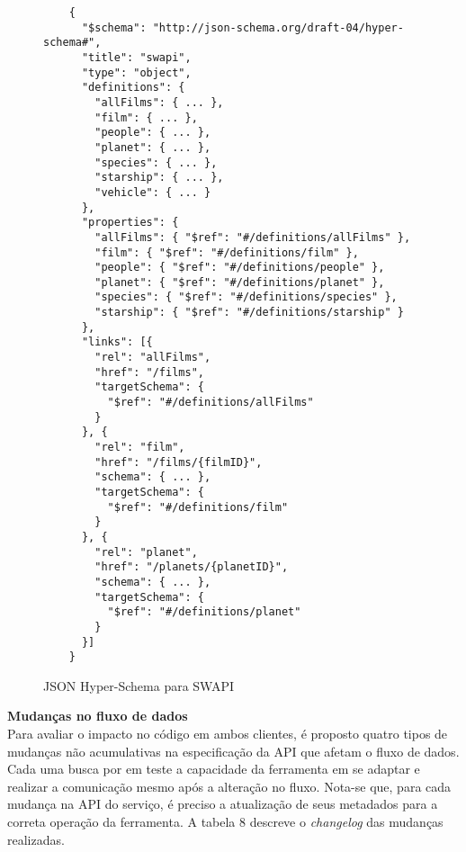 \begin{figure}[H]
  \centering
  \begin{verbatim}
    {
      "$schema": "http://json-schema.org/draft-04/hyper-schema#",
      "title": "swapi",
      "type": "object",
      "definitions": {
        "allFilms": { ... },
        "film": { ... },
        "people": { ... },
        "planet": { ... },
        "species": { ... },
        "starship": { ... },
        "vehicle": { ... }
      },
      "properties": {
        "allFilms": { "$ref": "#/definitions/allFilms" },
        "film": { "$ref": "#/definitions/film" },
        "people": { "$ref": "#/definitions/people" },
        "planet": { "$ref": "#/definitions/planet" },
        "species": { "$ref": "#/definitions/species" },
        "starship": { "$ref": "#/definitions/starship" }
      },
      "links": [{
        "rel": "allFilms",
        "href": "/films",
        "targetSchema": {
          "$ref": "#/definitions/allFilms"
        }
      }, {
        "rel": "film",
        "href": "/films/{filmID}",
        "schema": { ... },
        "targetSchema": {
          "$ref": "#/definitions/film"
        }
      }, {
        "rel": "planet",
        "href": "/planets/{planetID}",
        "schema": { ... },
        "targetSchema": {
          "$ref": "#/definitions/planet"
        }
      }]
    }
  \end{verbatim}
  \caption{JSON Hyper-Schema para SWAPI}
\end{figure}

\textbf{Mudanças no fluxo de dados} \\

Para avaliar o impacto no código em ambos clientes, é proposto quatro tipos de mudanças não acumulativas na especificação da API que afetam o fluxo de dados. Cada uma busca por em teste a capacidade da ferramenta em se adaptar e realizar a comunicação mesmo após a alteração no fluxo. Nota-se que, para cada mudança na API do serviço, é preciso a atualização de seus metadados para a correta operação da ferramenta. A tabela 8 descreve o \textit{changelog} das mudanças realizadas.

